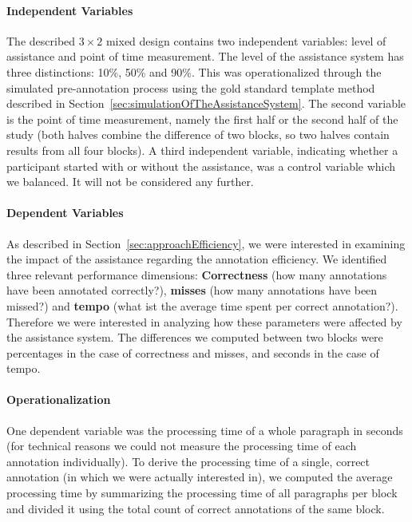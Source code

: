 		\paragraph{Independent Variables}
		The described \(3 \times 2\) mixed design contains two independent variables: level of assistance and point of time measurement. The level of the assistance system has three distinctions: 10\%, 50\% and 90\%. This was operationalized through the simulated pre-annotation process using the gold standard template method described in Section~\ref{sec:simulationOfTheAssistanceSystem}. The second variable is the point of time measurement, namely the first half or the second half of the study (both halves combine the difference of two blocks, so two halves contain results from all four blocks). A third independent variable, indicating whether a participant started with or without the assistance, was a control variable which we balanced. It will not be considered any further.

		\paragraph{Dependent Variables}
		As described in Section~\ref{sec:approachEfficiency}, we were interested in examining the impact of the assistance regarding the annotation efficiency. We identified three relevant performance dimensions: \textbf{Correctness} (how many annotations have been annotated correctly?), \textbf{misses} (how many annotations have been missed?) and \textbf{tempo} (what ist the average time spent per correct annotation?). Therefore we were interested in analyzing how these parameters were affected by the assistance system. The differences we computed between two blocks were percentages in the case of correctness and misses, and seconds in the case of tempo.

		\pagebreak

		\paragraph{Operationalization}
		One dependent variable was the processing time of a whole paragraph in seconds (for technical reasons we could not measure the processing time of each annotation individually). To derive the processing time of a single, correct annotation (in which we were actually interested in), we computed the average processing time by summarizing the processing time of all paragraphs per block and divided it using the total count of correct annotations of the same block.

